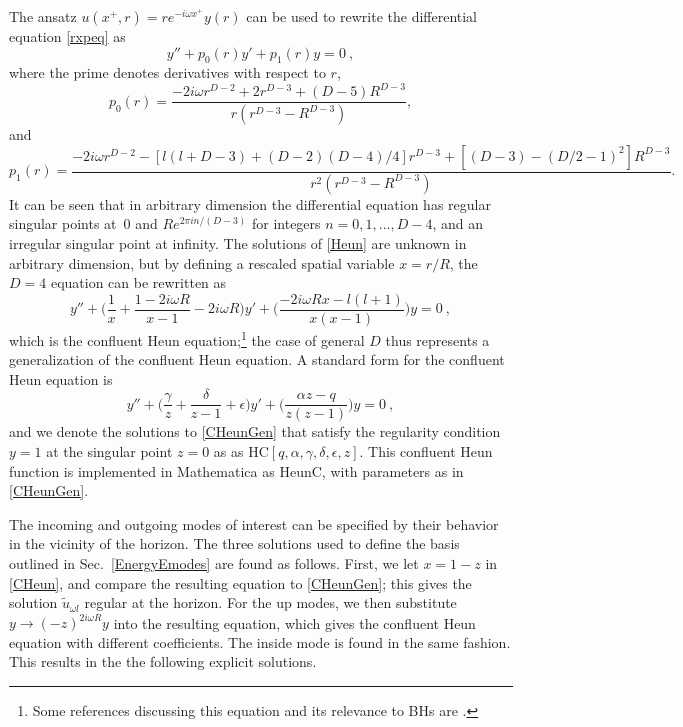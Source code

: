 \documentclass[12pt]{article}
\numberwithin{equation}{section}
\newcommand{\beq}{\begin{equation}}
\newcommand{\eeq}{\end{equation}}
\begin{document}
The ansatz $u(x^+, r) = r e^{-i \omega x^+} y(r)$ can be used to rewrite the differential equation \eqref{rxpeq} as 
\beq\label{Heun}
y''+p_0(r)y'+ p_1(r)y = 0\ ,
\eeq
where the prime denotes derivatives with respect to $r$,
\beq
p_0(r) = \frac{-2 i \omega r^{D-2}+2r^{D-3}+(D-5)R^{D-3}}{r(r^{D-3}-R^{D-3})},
\eeq
and
\beq
p_1(r)=\frac{-2 i \omega r^{D-2}-\left[ l(l+D-3)  + (D-2)(D-4)/4\right]r^{D-3} + \left[(D-3)-(D/2-1)^2\right] R^{D-3}}
{r^2(r^{D-3}-R^{D-3})}.
\eeq
It can be seen that in arbitrary dimension the differential equation has regular singular points at~$0$ and $R e^{2 \pi i n/ (D-3)}$ for integers $n = 0, 1,..., D-4$, and an irregular singular point at infinity. The solutions of \eqref{Heun} are unknown in arbitrary dimension, but by defining a rescaled spatial variable $x = r/R$, the $D=4$ equation can be rewritten  as
\beq\label{CHeun}
y''+\Big(\frac{1}{x}+\frac{1-2 i \omega R}{x-1}-2 i \omega R\Big)y'+ \Big(\frac{-2i \omega R x-l(l+1)}{x(x-1)}\Big)y = 0\ ,
\eeq
which is the confluent Heun equation;\footnote{Some references discussing this equation and its relevance to BHs are \cite{Leav,Fizi1,Fizi2,PhPe}.}  the case of general $D$ thus represents a generalization of the confluent Heun equation.  A standard form for the confluent Heun equation is
\beq\label{CHeunGen}
y''+\Big(\frac{\gamma}{z}+\frac{\delta}{z-1}+\epsilon\Big)y'+ \Big(\frac{\alpha z-q}{z(z-1)}\Big)y = 0\ ,
\eeq
and we denote the solutions to \eqref{CHeunGen} that satisfy the  regularity condition $y= 1$ at the singular point $z=0$ as 
as $\mathrm{HC}[q, \alpha, \gamma, \delta, \epsilon, z]$.  This confluent Heun function is  implemented in Mathematica as $\mathrm{HeunC}$, with  parameters as in \eqref{CHeunGen}. 

The incoming and outgoing modes of interest can be specified by their behavior in the vicinity of the horizon. The three solutions  used to define the basis outlined in 
Sec.~\ref{EnergyEmodes} are found as follows.  First, we let $x=1-z$ in \eqref{CHeun}, and compare the resulting equation to \eqref{CHeunGen}; this gives the solution $\tilde u_{\omega l}$ regular at the horizon.  For the up modes, we then substitute $y\rightarrow (-z)^{2i\omega R} y$ into the resulting equation, which gives the confluent Heun equation with different coefficients.  The inside mode is found in the same fashion.  This results in the the following explicit solutions.
\end{document}
